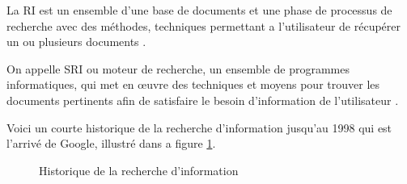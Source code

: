 \begin{definition}
    La RI est un ensemble d'une base de documents et une phase de processus de recherche avec des méthodes, techniques permettant a l'utilisateur de récupérer un ou plusieurs documents \citep{ri-sur-le-web}.
\end{definition}

\begin{definition}
    On appelle SRI ou moteur de recherche, un ensemble de programmes informatiques, qui met en œuvre des techniques et moyens pour trouver les documents pertinents afin de satisfaire le besoin d'information de l'utilisateur \citep{approche-semantique}.
\end{definition}

Voici un courte historique de la recherche d'information jusqu'au 1998 qui est l'arrivé de Google, illustré dans a figure \ref{ir-history}.

\begin{figure}[htbp]
    \begin{center}
        \caption{Historique de la recherche d'information \citep{ir-course}}
    \end{center}
    \label{ir-history}
\end{figure}

